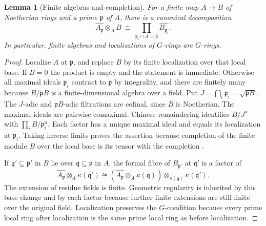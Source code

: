 \documentclass[11pt,oneside,openany]{book}
\newtheorem{lemma}[theorem]{Lemma}
\theoremstyle{definition}
\theoremstyle{remark}
\begin{document}
\begin{lemma}[Finite algebras and completion]\label{res:X06}
For a finite map \(A\to B\) of Noetherian rings and a prime \(\mathfrak p\) of \(A\), there is a canonical decomposition
\[
 \widehat{A_{\mathfrak p}}\otimes_A B
 \ \cong\ \prod_{\mathfrak p_i\cap A=\mathfrak p}\widehat{B_{\mathfrak p_i}}.
\]
In particular, finite algebras and localizations of \(G\)-rings are \(G\)-rings.
\end{lemma}
\begin{proof}
Localize \(A\) at \(\mathfrak p\), and replace \(B\) by its finite localization over that local base. If \(B=0\) the product is empty and the statement is immediate. Otherwise all maximal ideals \(\mathfrak p_i\) contract to \(\mathfrak p\) by integrality, and there are finitely many because \(B/\mathfrak p B\) is a finite-dimensional algebra over a field. Put \(J=\bigcap_i\mathfrak p_i=\sqrt{\mathfrak p B}\). The \(J\)-adic and \(\mathfrak p B\)-adic filtrations are cofinal, since \(B\) is Noetherian. The maximal ideals are pairwise comaximal. Chinese remaindering identifies \(B/J^n\) with \(\prod_i B/\mathfrak p_i^n\). Each factor has a unique maximal ideal and equals its localization at \(\mathfrak p_i\). Taking inverse limits proves the assertion because completion of the finite module \(B\) over the local base is its tensor with the completion \cite[ALG-05-C04-R03]{p103}.

If \(\mathfrak q'\subseteq\mathfrak p'\) in \(B\) lie over \(\mathfrak q\subseteq\mathfrak p\) in \(A\), the formal fibre of \(B_{\mathfrak p'}\) at \(\mathfrak q'\) is a factor of
\[
 \widehat{A_{\mathfrak p}}\otimes_A\kappa(\mathfrak q')
 \cong (\widehat{A_{\mathfrak p}}\otimes_A\kappa(\mathfrak q))
                         \otimes_{\kappa(\mathfrak q)}\kappa(\mathfrak q').
\]
The extension of residue fields is finite. Geometric regularity is inherited by this base change and by each factor because further finite extensions are still finite over the original field. Localization preserves the \(G\)-condition because every prime local ring after localization is the same prime local ring as before localization.
\end{proof}
\end{document}
